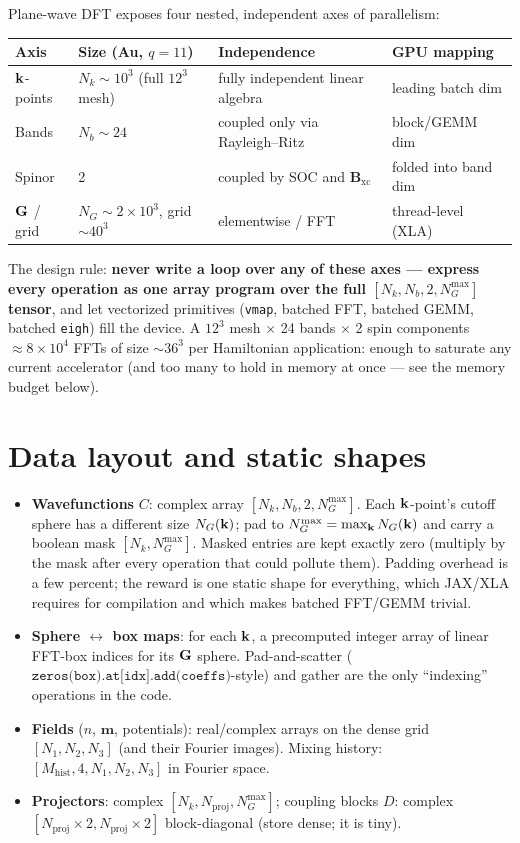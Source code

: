 Plane-wave DFT exposes four nested, independent axes of parallelism:
\begin{center}
\begin{tabular}{@{}llll@{}}
\toprule
Axis & Size (Au, $q{=}11$) & Independence & GPU mapping\\
\midrule
$\mathbf{k}$-points & $N_k \sim 10^3$ (full $12^3$ mesh)
& fully independent linear algebra & leading batch dim\\
Bands & $N_b \sim 24$ & coupled only via Rayleigh--Ritz & block/GEMM dim\\
Spinor & 2 & coupled by SOC and $\mathbf B_{\mathrm{xc}}$
& folded into band dim\\
$\mathbf{G}$ / grid & $N_G \sim 2{\times}10^3$, grid $\sim 40^3$
& elementwise / FFT & thread-level (XLA)\\
\bottomrule
\end{tabular}
\end{center}
The design rule: \textbf{never write a loop over any of these axes ---
express every operation as one array program over the full
$[N_k, N_b, 2, N_G^{\max}]$ tensor}, and let vectorized primitives
(\texttt{vmap}, batched FFT, batched GEMM, batched \texttt{eigh}) fill the
device. A $12^3$ mesh $\times$ 24 bands $\times$ 2 spin components $\approx
8\times10^4$ FFTs of size $\sim 36^3$ per Hamiltonian application: enough
to saturate any current accelerator (and too many to hold in memory at
once --- see the memory budget below).

\section{Data layout and static shapes}

\begin{itemize}[leftmargin=2em]
\item \textbf{Wavefunctions} $C$: complex array $[N_k, N_b, 2, N_G^{\max}]$.
Each $\mathbf{k}$-point's cutoff sphere has a different size $N_G(\mathbf{k})$; pad to
$N_G^{\max} = \max_{\mathbf{k}} N_G(\mathbf{k})$ and carry a boolean mask
$[N_k, N_G^{\max}]$. Masked entries are kept exactly zero (multiply by the
mask after every operation that could pollute them). Padding overhead is a
few percent; the reward is one static shape for everything, which JAX/XLA
requires for compilation and which makes batched FFT/GEMM trivial.
\item \textbf{Sphere $\leftrightarrow$ box maps}: for each $\mathbf{k}$, a
precomputed integer array of linear FFT-box indices for its $\mathbf{G}$ sphere.
Pad-and-scatter ($\texttt{zeros(box).at[idx].add(coeffs)}$-style) and
gather are the only ``indexing'' operations in the code.
\item \textbf{Fields} ($n$, $\mathbf m$, potentials): real/complex arrays on
the dense grid $[N_1, N_2, N_3]$ (and their Fourier images). Mixing history:
$[M_{\mathrm{hist}}, 4, N_1, N_2, N_3]$ in Fourier space.
\item \textbf{Projectors}: complex $[N_k, N_{\mathrm{proj}}, N_G^{\max}]$;
coupling blocks $D$: complex
$[N_{\mathrm{proj}} \times 2, N_{\mathrm{proj}} \times 2]$ block-diagonal
(store dense; it is tiny).
\end{itemize}

